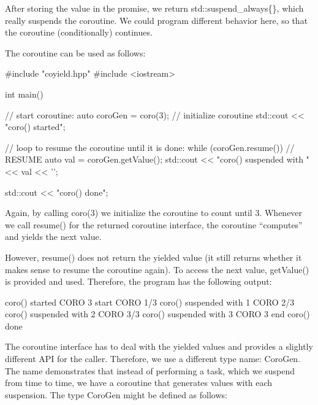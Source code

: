 After storing the value in the promise, we return std::suspend\_always\{\}, which really suspends the coroutine. We could program different behavior here, so that the coroutine (conditionally) continues.

The coroutine can be used as follows:


\begin{cpp}
#include "coyield.hpp"
#include <iostream>

int main()
{
	// start coroutine:
	auto coroGen = coro(3); // initialize coroutine
	std::cout << "coro() started\n";
	
	// loop to resume the coroutine until it is done:
	while (coroGen.resume()) { // RESUME
		auto val = coroGen.getValue();
		std::cout << "coro() suspended with " << val << '\n';
	}
	
	std::cout << "coro() done\n";
}
\end{cpp}

Again, by calling coro(3) we initialize the coroutine to count until 3. Whenever we call resume() for the returned coroutine interface, the coroutine “computes” and yields the next value.

However, resume() does not return the yielded value (it still returns whether it makes sense to resume the coroutine again). To access the next value, getValue() is provided and used. Therefore, the program has the following output:

\begin{shell}
coro() started
         CORO 3 start
         CORO 1/3
coro() suspended with 1
         CORO 2/3
coro() suspended with 2
         CORO 3/3
coro() suspended with 3
         CORO 3 end
coro() done
\end{shell}

The coroutine interface has to deal with the yielded values and provides a slightly different API for the caller. Therefore, we use a different type name: CoroGen. The name demonstrates that instead of performing a task, which we suspend from time to time, we have a coroutine that generates values with each suspension. The type CoroGen might be defined as follows:


